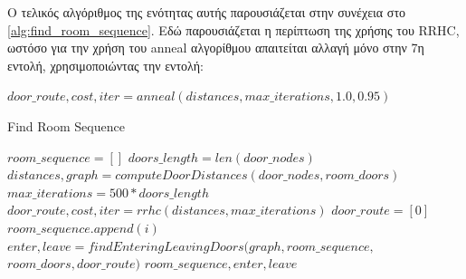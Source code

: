 Ο τελικός αλγόριθμος της ενότητας αυτής παρουσιάζεται στην συνέχεια στο \ref{alg:find_room_sequence}. Εδώ παρουσιάζεται η περίπτωση της χρήσης του RRHC, ωστόσο για την χρήση του anneal αλγορίθμου απαιτείται αλλαγή μόνο στην 7η εντολή, χρησιμοποιώντας την εντολή:

$door\_route, cost, iter = anneal(distances, max\_iterations, 1.0, 0.95)$


\begin{algorithm}[H]
\caption{Find Room Sequence}
\label{alg:find_room_sequence}
\begin{algorithmic}[1]
        \State $room\_sequence = []$
        \State $doors\_length = len(door\_nodes)$
            \State $distances, graph = computeDoorDistances(door\_nodes, room\_doors)$
            \State $max\_iterations = 500 * doors\_length$
            \State $door\_route, cost, iter = rrhc(distances, max\_iterations)$
        \Else
            \State $door\_route = [0]$
        \EndIf
        \State {}
                    \State $room\_sequence.append(i)$
                \EndIf
            \EndFor
        \EndFor
        \State $enter, leave = findEnteringLeavingDoors(graph, room\_sequence,$
        \Statex $room\_doors, door\_route)$ 
    \State \Return $room\_sequence, enter, leave$
\end{algorithmic}
\end{algorithm}


